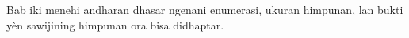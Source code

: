 \documentclass[../../../include/open-logic-chapter]{subfiles}
\begin{document}

\begin{editorial}
Bab iki menehi andharan dhasar ngenani enumerasi, ukuran himpunan, lan bukti yèn sawijining himpunan ora bisa didhaptar.
\end{editorial}











\OLEndChapterHook
\end{document}
